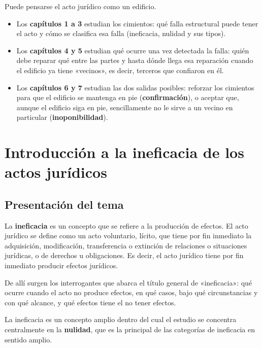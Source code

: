 \documentclass[12pt,oneside]{book}
\begin{document}
Puede pensarse el acto jurídico como un edificio.

\begin{itemize}
    \item Los \textbf{capítulos 1 a 3} estudian los cimientos: qué falla estructural puede tener el acto y cómo se clasifica esa falla (ineficacia, nulidad y sus tipos).
    \item Los \textbf{capítulos 4 y 5} estudian qué ocurre una vez detectada la falla: quién debe reparar qué entre las partes y hasta dónde llega esa reparación cuando el edificio ya tiene «vecinos», es decir, terceros que confiaron en él.
    \item Los \textbf{capítulos 6 y 7} estudian las dos salidas posibles: reforzar los cimientos para que el edificio se mantenga en pie (\textbf{confirmación}), o aceptar que, aunque el edificio siga en pie, sencillamente no le sirve a un vecino en particular (\textbf{inoponibilidad}).
\end{itemize}

\chapter[Introducción a la ineficacia]{Introducción a la ineficacia de los actos jurídicos}

\section{Presentación del tema}

La \textbf{ineficacia} es un concepto que se refiere a la producción de efectos. El acto jurídico se define como un acto voluntario, lícito, que tiene por fin inmediato la adquisición, modificación, transferencia o extinción de relaciones o situaciones jurídicas, o de derechos u obligaciones. Es decir, el acto jurídico tiene por fin inmediato producir efectos jurídicos.

De allí surgen los interrogantes que abarca el título general de «ineficacia»: qué ocurre cuando el acto no produce efectos, en qué casos, bajo qué circunstancias y con qué alcance, y qué efectos tiene el no tener efectos.

La ineficacia es un concepto amplio dentro del cual el estudio se concentra centralmente en la \textbf{nulidad}, que es la principal de las categorías de ineficacia en sentido amplio.
\end{document}
